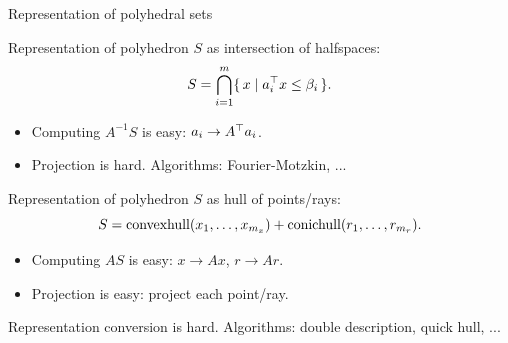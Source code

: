 
\begin{frame}{Representation of polyhedral sets}
  \begin{block}{\hrep}
    Representation of polyhedron $S$ as intersection of halfspaces:
    \[ S = \bigcap_{i=1}^m \{\, x \mid a_i^\top x \le \beta_i \,\}. \]
    \vspace{-2.5em}
    \begin{itemize}
      \item Computing $A^{-1} S$ is \alert{easy}: $a_i \to A^\top a_i$.
      \item Projection is \alert{hard}. Algorithms: Fourier-Motzkin, ...
    \end{itemize}
  \end{block}
  \begin{block}{\vrep}
    Representation of polyhedron $S$ as hull of points/rays:
    \[ S = \operatorname{convexhull}(x_1, \ldots, x_{m_x}) + \operatorname{conichull}(r_1, \ldots, r_{m_r}). \]
    \vspace{-3em}
    \begin{itemize}
      \item Computing $A S$ is \alert{easy}: $x \to A x$, $r \to A r$.
      \item Projection is \alert{easy}: project each point/ray.
    \end{itemize}
  \end{block}
  \vspace{-1em}
  Representation conversion is \alert{hard}. Algorithms: double description,
  quick hull, ...
\end{frame}



